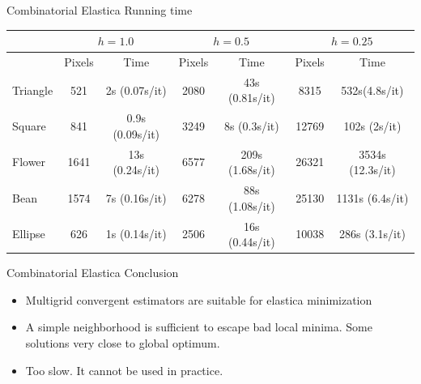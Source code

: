 \begin{frame}
{Combinatorial Elastica}
{Running time}
\begin{center}
\captionsetup{type=table}
\scriptsize
\begin{tabular}{|l|c|c|c|c|c|c|}
\hline
& \multicolumn{2}{c|}{$h=1.0$} & \multicolumn{2}{c|}{$h=0.5$} & \multicolumn{2}{c|}{$h=0.25$}\\
\hline
& Pixels & Time & Pixels & Time & Pixels & Time\\
\hline
Triangle & 521 & 2s (0.07s/it)  & 2080 & 43s (0.81s/it) & 8315 & 532s(4.8s/it)\\
Square & 841 & 0.9s (0.09s/it) & 3249 & 8s (0.3s/it) & 12769 & 102s (2s/it)\\
Flower & 1641 & 13s (0.24s/it) & 6577 & 209s (1.68s/it) & 26321 & 3534s (12.3s/it)\\
Bean  & 1574 & 7s (0.16s/it) & 6278 & 88s (1.08s/it) & 25130 & 1131s (6.4s/it)\\
Ellipse  & 626 & 1s (0.14s/it) & 2506 & 16s (0.44s/it) & 10038 & 286s (3.1s/it)\\
\hline
\end{tabular}
\caption{\textbf{Running time of LocalSearch.} The running times for the free elastica problem are displayed. Notice that even having a similar number of pixels, the square (bean) shape evolves much faster than the triangle (flower).}
\end{center}
\end{frame}

\begin{frame}
{Combinatorial Elastica}
{Conclusion}

\begin{itemize}
\item{Multigrid convergent estimators are suitable for elastica minimization}\pause
\item{A simple neighborhood is sufficient to escape bad local minima. Some solutions very close to global optimum.}\pause
\item{Too slow. It cannot be used in practice.}
\end{itemize}
\end{frame}